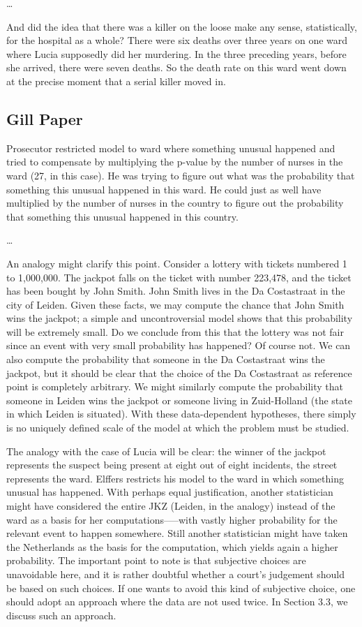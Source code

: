 \documentclass[letterpaper, landscape]{exam}
\begin{document}
  \dots

  And did the idea that there was a killer on the loose make any sense,
  statistically, for the hospital as a whole? There were six deaths over three
  years on one ward where Lucia supposedly did her murdering. In the three
  preceding years, before she arrived, there were seven deaths. So the death
  rate on this ward went down at the precise moment that a serial killer moved
  in.


  \subsection{Gill Paper} %
  
  Prosecutor restricted model to ward where something unusual happened and tried
  to compensate by multiplying the p-value by the number of nurses in the ward
  (27, in this case). He was trying to figure out what was the probability that
  something this unusual happened in this ward. He could just as well have
  multiplied by the number of nurses in the country to figure out the
  probability that something this unusual happened in this country.

  \dots

  An analogy might clarify this point. Consider a lottery with tickets
  numbered 1 to 1,000,000. The jackpot falls on the ticket with number
  223,478, and the ticket has been bought by John Smith. John Smith lives in
  the Da Costastraat in the city of Leiden. Given these facts, we may compute
  the chance that John Smith wins the jackpot; a simple and uncontroversial
  model shows that this probability will be extremely small. Do we conclude
  from this that the lottery was not fair since an event with very small
  probability has happened? Of course not. We can also compute the probability
  that someone in the Da Costastraat wins the jackpot, but it should be clear
  that the choice of the Da Costastraat as reference point is completely
  arbitrary. We might similarly compute the probability that someone in Leiden
  wins the jackpot or someone living in Zuid-Holland (the state in which
  Leiden is situated). With these data-dependent hypotheses, there simply is
  no uniquely defined scale of the model at which the problem must be studied.

  The analogy with the case of Lucia will be clear: the winner of the jackpot
  represents the suspect being present at eight out of eight incidents, the
  street represents the ward. Elffers restricts his model to the ward in which
  something unusual has happened. With perhaps equal justification, another
  statistician might have considered the entire JKZ (Leiden, in the analogy)
  instead of the ward as a basis for her computations--—with vastly higher
  probability for the relevant event to happen somewhere. Still another
  statistician might have taken the Netherlands as the basis for the
  computation, which yields again a higher probability. The important point to
  note is that subjective choices are unavoidable here, and it is rather
  doubtful whether a court’s judgement should be based on such choices. If one
  wants to avoid this kind of subjective choice, one should adopt an approach
  where the data are not used twice. In Section 3.3, we discuss such an
  approach.
\end{document}

